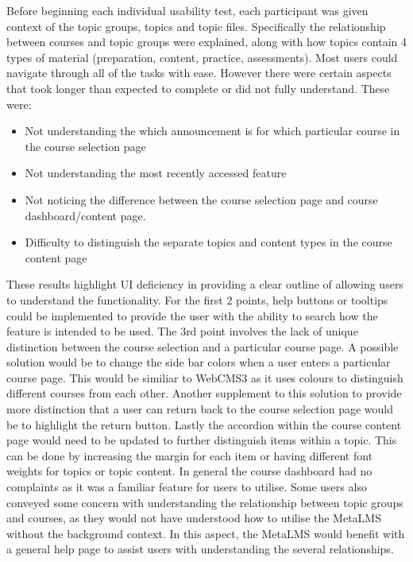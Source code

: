 Before beginning each individual usability test, each participant was given context of the topic groups, topics and topic files. Specifically the relationship between courses and topic groups were explained, along with how topics contain 4 types of material (preparation, content, practice, assessments).
Most users could navigate through all of the tasks with ease. However there were certain aspects that took longer than expected to complete or did not fully understand.
These were:
\begin{itemize}
    \item Not understanding the which announcement is for which particular course in the course selection page
    \item Not understanding the most recently accessed feature
    \item Not noticing the difference between the course selection page and course dashboard/content page.
    \item Difficulty to distinguish the separate topics and content types in the course content page
\end{itemize}

These results highlight UI deficiency in providing a clear outline of allowing users to understand the functionality.
For the first 2 points, help buttons or tooltips could be implemented to provide the user with the ability to search how the feature is intended to be used.
The 3rd point involves the lack of unique distinction between the course selection and a particular course page. A possible solution would be to change the side bar colors when a user enters a particular course page.
This would be similiar to WebCMS3 as it uses colours to distinguish different courses from each other.
Another supplement to this solution to provide more distinction that a user can return back to the course selection page would be to highlight the return button.
Lastly the accordion within the course content page would need to be updated to further distinguish items within a topic. This can be done by increasing the margin for each item or having different font weights for topics or topic content.
In general the course dashboard had no complaints as it was a familiar feature for users to utilise.
Some users also conveyed some concern with understanding the relationship between topic groups and courses, as they would not have understood how to utilise the MetaLMS without the background context.
In this aspect, the MetaLMS would benefit with a general help page to assist users with understanding the several relationships.